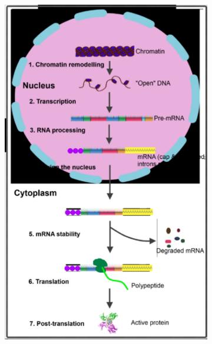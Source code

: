 \documentclass[]{article}
\begin{document}
\begin{figure}[H]
	\caption{Nucleus and endomembrane system allow for finer gene
		regulation}\label{fig:finer:gene:regulation}
	\begin{subfigure}[b]{0.45\textwidth}
		\includegraphics[width=\textwidth]{Regulation1}
	\end{subfigure}
	\begin{subfigure}[b]{0.45\textwidth}

\end{subfigure}
\end{figure}
\end{document}
